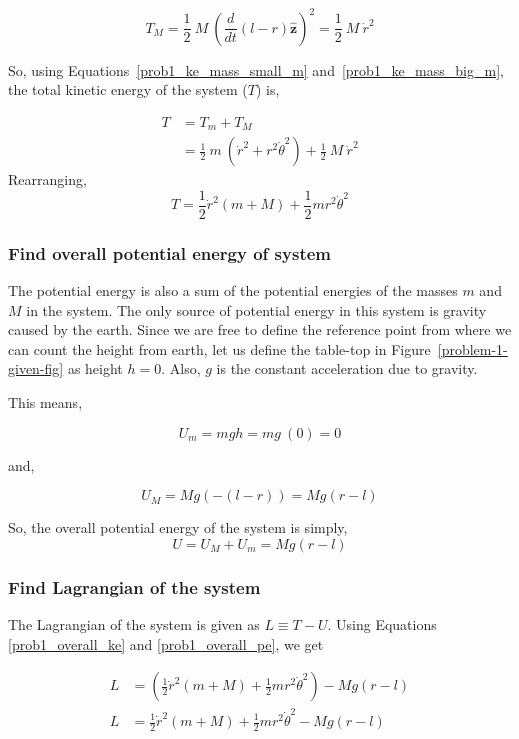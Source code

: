 \documentclass[conference]{IEEEtran}
\begin{document}
\begin{equation} \label{prob1_ke_mass_big_m}    
    T_M = \frac{1}{2}~M~\left(\frac{d}{dt}(l-r)\hat{\textbf{z}}\right)^2 = \frac{1}{2}~M~\dot{r}^2
\end{equation}

So, using Equations~\ref{prob1_ke_mass_small_m} and~\ref{prob1_ke_mass_big_m},
the total kinetic energy of the system ($T$) is,

\begin{align*}
    T &= T_m + T_M\\
      &=\frac{1}{2}~m~(\dot{r}^2 + r^2\dot{\theta}^2) + \frac{1}{2}~M~\dot{r}^2
\end{align*}
Rearranging,
\begin{equation} \label{prob1_overall_ke}
    T = \frac{1}{2} \dot{r}^2 (m + M) + \frac{1}{2} m r^2 \dot{\theta}^2
\end{equation}

\subsubsection{Find overall potential energy of system}
The potential energy is also a sum of the potential energies of the masses
$m$ and $M$ in the system. The only source of potential energy in
this system is gravity caused by the earth. Since we are free to define
the reference point from where we can count the height from earth, let us
define the table-top in Figure~\ref{problem-1-given-fig} as height $h = 0$.
Also, $g$ is the constant acceleration due to gravity.

This means,

\[
    U_m = mgh = mg~(0) = 0
\]

and,

\[
    U_M = Mg(-(l-r)) = Mg(r-l)
\]

So, the overall potential energy of the system is simply,
\begin{equation} \label{prob1_overall_pe}
    U = U_M + U_m = Mg(r-l)
\end{equation}

\subsubsection{Find Lagrangian of the system}
The Lagrangian of the system is given as $L \equiv T - U$. Using Equations 
\ref{prob1_overall_ke} and \ref{prob1_overall_pe}, we get

\begin{align*}
    L &= \left(\frac{1}{2} \dot{r}^2 (m + M) + 
        \frac{1}{2} m r^2 \dot{\theta}^2\right)-Mg(r-l)\\
    L &= \frac{1}{2} \dot{r}^2 (m + M) + 
    \frac{1}{2} m r^2 \dot{\theta}^2 - Mg(r-l)
\end{align*}
\end{document}
